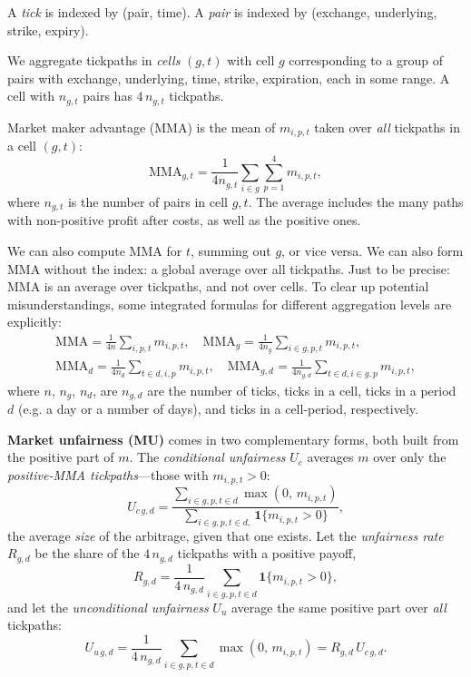 \documentclass[12pt]{article}
\begin{document}
A \emph{tick} is indexed by (pair, time). A \emph{pair} is indexed by (exchange, underlying, strike, expiry).

We aggregate tickpaths in \emph{cells} $(g,t)$ with cell $g$ corresponding to a group of pairs with exchange, underlying, time, strike, expiration, each in some range. A cell with $n_{g,t}$ pairs has $4\,n_{g,t}$ tickpaths. 

Market maker advantage (MMA) is the mean of $m_{i,p,t}$ taken over \emph{all} tickpaths in a cell $(g,t)$:
\begin{equation}
\mathrm{MMA}_{g,t}=\frac{1}{4n_{g,t}}\sum_{i\in g}\sum_{p=1}^{4} m_{i,p,t},
\end{equation}
where $n_{g,t}$ is the number of pairs in cell $g,t$. The average includes the many paths with non-positive profit after costs, as well as the positive ones. 

We can also compute MMA for $t$, summing out $g$, or vice versa. We can also form MMA without the index: a global average over all tickpaths. Just to be precise: MMA is an average over tickpaths, and not over cells. To clear up potential misunderstandings, some integrated formulas for different aggregation levels are explicitly:
\begin{equation}
\begin{split}
\mathrm{MMA}=\frac{1}{4n}\sum_{i,p,t} m_{i,p,t}, \quad
\mathrm{MMA}_{g}=\frac{1}{4n_{g}}\sum_{i\in g,p,t} m_{i,p,t}, \\
\mathrm{MMA}_{d}=\frac{1}{4n_d}\sum_{t\in d,i,p} m_{i,p,t}, \quad
\mathrm{MMA}_{g,d}=\frac{1}{4n_{g,d}}\sum_{t\in d,i\in g,p} m_{i,p,t},
\end{split}
\end{equation}
where $n$, $n_g$, $n_d$, are $n_{g,d}$ are the number of ticks, ticks in a cell, ticks in a period $d$ (e.g. a day or a number of days), and ticks in a cell-period, respectively. 

\textbf{Market unfairness (MU)} comes in two complementary forms, both built from the positive part of $m$. The \emph{conditional unfairness} $U_{c}$ averages $m$ over only the \emph{positive-MMA tickpaths}---those with $m_{i,p,t}>0$:
\begin{equation}
U_{c\,g,d}=\frac{\sum_{i\in g,p,t\in d}\max\!\left(0,\,m_{i,p,t}\right)}
{\sum_{i\in g,p,t\in d,}\mathbf{1}\{m_{i,p,t}>0\}},
\end{equation}
the average \emph{size} of the arbitrage, given that one exists. Let the \emph{unfairness rate} $R_{g,d}$ be the share of the $4\,n_{g,d}$ tickpaths with a positive payoff,
\begin{equation}
R_{g,d}=\frac{1}{4\,n_{g,d}}\sum_{i\in g,p,t\in d}\mathbf{1}\{m_{i,p,t}>0\},
\end{equation}
and let the \emph{unconditional unfairness} $U_{u}$ average the same positive part over \emph{all} tickpaths:
\begin{equation}
U_{u\,g,d}=\frac{1}{4\,n_{g,d}}\sum_{i\in g,p,t\in d}\max\!\left(0,\,m_{i,p,t}\right)=R_{g,d}\,U_{c\,g,d}.
\label{eq:amu-decomposition}
\end{equation}
\end{document}
